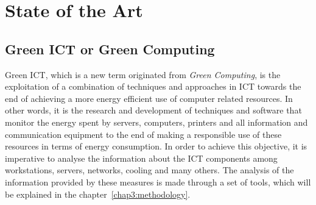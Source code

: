 

\chapter{State of the Art} \label{chap2:state_of_the_art}
    \section{Green ICT or Green Computing} \label{sec2:green_ict}
		Green ICT, which is a new term originated from \emph{Green Computing}, is the exploitation of a combination of techniques and approaches in ICT towards the end of achieving a more energy efficient use of computer related resources. In other words, it is the research and development of techniques and software that monitor the energy spent by servers, computers, printers and all information and communication equipment to the end of making a responsible use of these resources in terms of energy consumption. In order to achieve this objective, it is imperative to analyse the information about the ICT components among workstations, servers, networks, cooling and many others. The analysis of the information provided by these measures is made through a set of tools, which will be explained in the chapter~\ref{chap3:methodology}.        

